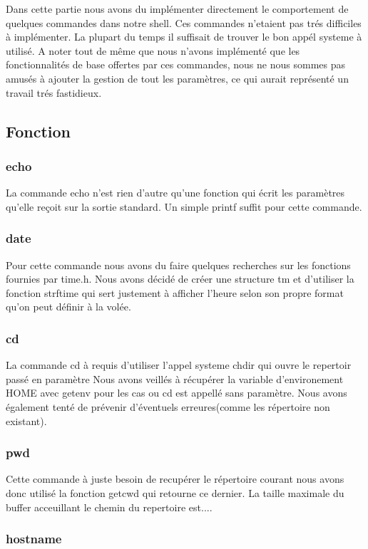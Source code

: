 \documentclass[12pt]{article}
\begin{document}
Dans cette partie nous avons du implémenter directement le comportement de quelques
commandes dans notre shell. Ces commandes n'etaient pas trés difficiles à implémenter. La plupart
du temps il suffisait de trouver le bon appél systeme à utilisé. A noter tout de même
que nous n'avons implémenté que les fonctionnalités de base offertes par ces commandes, nous
ne nous sommes pas amusés à ajouter la gestion de tout les paramètres, ce qui aurait 
représenté un travail trés fastidieux.

\subsection{Fonction}
\subsubsection{echo}
 La commande echo n'est rien d'autre qu'une fonction qui écrit les paramètres qu'elle reçoit
 sur la sortie standard. Un simple printf suffit pour cette commande.
 
\subsubsection{date}
 Pour cette commande nous avons du faire quelques recherches sur les fonctions fournies par time.h.
 Nous avons décidé de créer une structure tm et d'utiliser la fonction strftime qui
 sert justement à afficher l'heure selon son propre format qu'on peut définir à la volée.
 
 \subsubsection{cd}
 La commande cd à requis d'utiliser l'appel systeme chdir qui ouvre le repertoir passé en paramètre
 Nous avons veillés à récupérer la variable d'environement HOME avec getenv pour les cas ou cd est
 appellé sans paramètre. Nous avons également tenté de prévenir d'éventuels erreures(comme les
 répertoire non existant).
 
 \subsubsection{pwd}
 Cette commande à juste besoin de recupérer le répertoire courant nous avons donc utilisé
 la fonction getcwd qui retourne ce dernier. La taille maximale du buffer acceuillant le chemin
 du repertoire est....
 
 \subsubsection{hostname}
 
\end{document}

